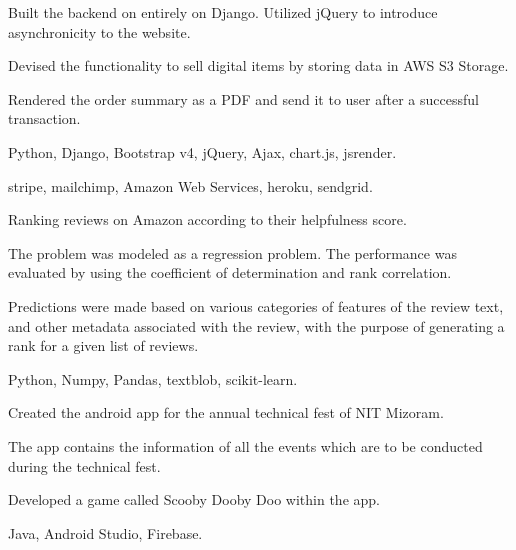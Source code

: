 \begin{tightemize}
\item Built the backend on entirely on Django. Utilized jQuery to introduce asynchronicity to the website.
\item Devised the functionality to sell digital items by storing data in AWS S3 Storage.
\item Rendered the order summary as a PDF and send it to user after a successful transaction.
\item {} Python, Django, Bootstrap v4, jQuery, Ajax, chart.js, jsrender.
\item {} stripe, mailchimp, Amazon Web Services, heroku, sendgrid.
\end{tightemize}
\sectionsep

\begin{tightemize}
\item Ranking reviews on Amazon according to their helpfulness score.
\item The problem was modeled as a regression problem. The performance was evaluated by using the coefficient of determination and rank correlation.
\item Predictions were made based on various categories of features of the review text, and other metadata associated with the review, with the purpose of generating a rank for a given list of reviews.
\item {} Python, Numpy, Pandas, textblob, scikit-learn.
\end{tightemize}
\sectionsep

\begin{tightemize}\item Created the android app for the annual technical fest of NIT Mizoram.
\item The app contains the information of all the events which are to be conducted during the technical fest.
\item Developed a game called Scooby Dooby Doo within the app.
\item {} Java, Android Studio, Firebase.
\end{tightemize}
\sectionsep